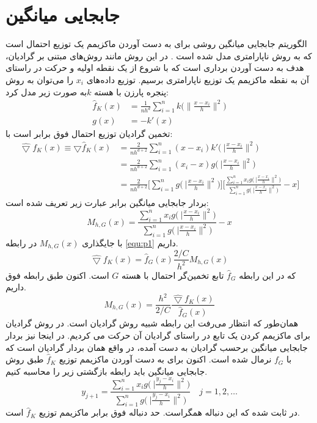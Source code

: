 \chapter{جابجایی میانگین}\label{app:ms}
الگوریتم جابجایی میانگین روشی برای به دست آوردن ماکزیمم یک توزیع احتمال است که به روش ناپارامتری مدل شده‌ است \cite{Comaniciu2002}. در این روش مانند روش‌های مبتنی بر گرادیان، هدف به دست آوردن برداری است که با شروع از یک نقطه اولیه و حرکت در راستای آن به نقطه ماکزیمم یک توزیع ناپارامتری برسیم.
توزیع داده‌های $x_i$ را می‌توان به روش پنجره پارزن با هسته $k$به صورت زیر مدل کرد:
\begin{align}
\hat{f}_K(x) &= \frac{1}{nh^d} \sum_{i=1}^n k \Big( \|\frac{x-x_i}{h}\|^2 \Big)  \\
\nonumber g(x)&=-k'(x)
\end{align}
تخمین گرادیان توزیع احتمال فوق برابر است با:
\begin{align}
\nonumber  \hat{\bigtriangledown}f_K(x) \equiv \bigtriangledown \hat{f}_K(x) &= \frac{2}{nh^{d+2}} \sum_{i=1}^n (x-x_i) k' \Big(\ |\frac{x-x_i}{h}\|^2 \Big)  \\
\nonumber &= \frac{2}{nh^{d+2}} \sum_{i=1}^n (x_i-x) g \Big(\ |\frac{x-x_i}{h}\|^2 \Big)  \\
&= \frac{2}{nh^{d+2}} \Big[ \sum_{i=1}^n g \Big(\ |\frac{x-x_i}{h}\|^2 \Big) \Big] 
\Big[ \frac{\sum_{i=1}^n x_i g \Big(\ |\frac{x-x_i}{h}\|^2 \Big)}{\sum_{i=1}^n g \Big(\ |\frac{x-x_i}{h}\|^2 \Big)}-x \Big]
\label{equ:p1}
\end{align}
بردار جابجایی میانگین برابر عبارت زیر تعریف شده است:
\begin{equation}
M_{h,G}(x)=\frac{\sum_{i=1}^n x_i g \Big(\ |\frac{x-x_i}{h}\|^2 \Big)}{\sum_{i=1}^n g \Big(\ |\frac{x-x_i}{h}\|^2 \Big)}-x
\end{equation}
با جایگذاری $M_{h,G}(x)$ در رابطه \ref{equ:p1} داریم.
\begin{equation}
\hat{\bigtriangledown}f_K(x) = \hat{f}_G(x) \frac{2/C}{h^2} M_{h,G}(x)
\end{equation}
که در این رابطه  $\hat{f}_G$ تابع تخمین‌گر احتمال با هسته $G$ است. اکنون طبق رابطه فوق داریم.
\begin{equation}
M_{h,G}(x) = \frac{h^2}{2/C} \frac{\hat{\bigtriangledown}f_K(x)}{\hat{f}_G(x) }
\end{equation}
همان‌طور که انتظار می‌رفت این رابطه شبیه روش گرادیان است. در روش گرادیان برای ماکزیمم کردن یک تابع در راستای گرادیان آن حرکت می کردیم. در اینجا نیز بردار جابجایی میانگین  برحسب گرادیان به دست آمده، در واقع همان بردار گرادیان است که با $f_G$ نرمال شده است.
اکنون برای به دست آوردن ماکزیمم توزیع $\hat{f}_K$  طبق روش جابجایی میانگین باید رابطه بازگشتی زیر را محاسبه کنیم. 
\begin{equation}
y_{j+1}=\frac{\sum_{i=1}^n x_i g \Big(\ |\frac{y_j-x_i}{h}\|^2 \Big)}{\sum_{i=1}^n g \Big(\ |\frac{y_j-x_i}{h}\|^2 \Big)} \quad j=1,2,\ldots
\end{equation}
در  \cite{Comaniciu2002} ثابت شده که این  دنباله همگراست. حد دنباله فوق برابر ماکزیمم توزیع $\hat{f}_K$ است.